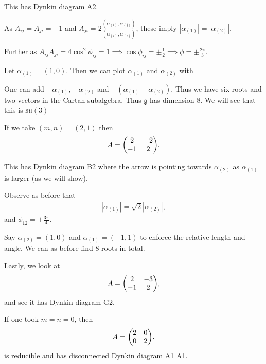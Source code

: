 This has Dynkin diagram \dynkin A2.

As $A_{ij} = A_{ji} = -1$ and $A_{ji} = 2 \frac{\left( \alpha_{\left( i \right) }, \alpha_{\left( j \right) } \right) }{\left( \alpha_{\left( i \right) }, \alpha_{\left( i \right) } \right) }$, these imply $\left| \alpha_{\left( 1 \right) } \right| = \left| \alpha_{\left( 2 \right) } \right| $.

Further as $A_{ij} A_{ji} = 4 \cos^2 \phi_{ij} = 1 \implies  \cos \phi_{ij} = \pm \frac{1}{2} \implies \phi = \pm \frac{2\pi}{3}$.

Let $\alpha_{\left( 1 \right) } = \left( 1,0 \right) $. Then we can plot $\alpha_{\left( 1 \right) }$ and $\alpha_{\left( 2 \right) }$ with

One can add $-\alpha_{\left( 1 \right) }$, $-\alpha_{\left( 2 \right) }$ and $\pm \left( \alpha_{\left( 1 \right)}  + \alpha_{\left( 2 \right)}   \right) $. Thus we have six roots and two vectors in the Cartan subalgebra. Thus $\mathfrak{g}$ has dimension 8. We will see that this is $\mathfrak{su}\left( 3 \right) $

If we take $\left( m,n \right) = \left( 2,1 \right) $ then
\begin{align}
    A = \mqty( 2 & -2 \\ -1 & 2)
.\end{align}

This has Dynkin diagram \dynkin B2 where the arrow is pointing towards $\alpha_{\left( 2 \right) }$ as $\alpha_{\left( 1 \right) }$ is larger (as we will show).

Observe as before that
\begin{align}
    \left| \alpha_{\left( 1 \right) } \right| = \sqrt{2} \left| \alpha_{\left( 2 \right) } \right| 
,\end{align}
and $\phi_{12} = \pm \frac{3\pi}{4}$.

Say $\alpha_{\left( 2 \right) } = \left( 1,0 \right) $ and $\alpha_{\left( 1 \right) } = \left( -1,1 \right) $ to enforce the relative length and angle. We can as before find 8 roots in total.

Lastly, we look at
\begin{align}
    A = \mqty( 2 & -3 \\ - 1 & 2)
,\end{align}
 and see it has Dynkin diagram \dynkin G2.

 \begin{note}
     If one took $m = n = 0$, then
     \begin{align}
         A = \mqty( 2 & 0 \\ 0 & 2)
     ,\end{align}
     is reducible and has disconnected Dynkin diagram \dynkin A1 \dynkin A1.
 \end{note}


